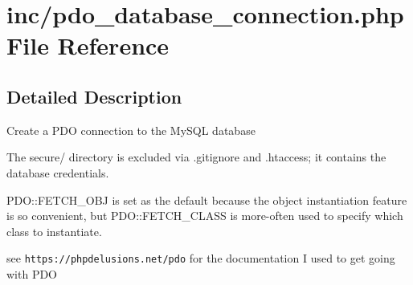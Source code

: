 \section{inc/pdo\+\_\+database\+\_\+connection.php File Reference}
\label{pdo__database__connection_8php}


\subsection{Detailed Description}
Create a P\+DO connection to the My\+S\+QL database

The secure/ directory is excluded via .gitignore and .htaccess; it contains the database credentials.

P\+D\+O\+::\+F\+E\+T\+C\+H\+\_\+\+O\+BJ is set as the default because the object instantiation feature is so convenient, but P\+D\+O\+::\+F\+E\+T\+C\+H\+\_\+\+C\+L\+A\+SS is more-\/often used to specify which class to instantiate.

see {\tt https\+://phpdelusions.\+net/pdo} for the documentation I used to get going with P\+DO 